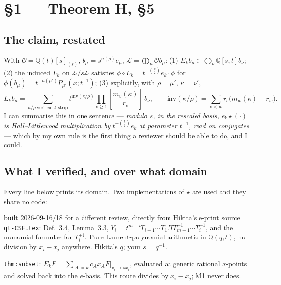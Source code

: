 \documentclass[11pt]{article}
\newcommand{\qbin}[2]{\genfrac{[}{]}{0pt}{}{#1}{#2}}
\begin{document}
\section{\S1 --- Theorem H, \S5}

\subsection{The claim, restated}

With $\mathcal O=\mathbb Q(t)[s]_{(s)}$, $b_\mu=s^{n(\mu)}e_\mu$, $\mathcal L=\bigoplus_\mu\mathcal O b_\mu$:
(1) $E_kb_\mu\in\bigoplus_\nu\mathbb Q[s,t]b_\nu$; (2) the induced $L_k$ on $\mathcal L/s\mathcal L$
satisfies $\phi\circ L_k=t^{-\binom k2}e_k\cdot\phi$ for
$\phi(\bar b_\mu)=t^{-n(\mu')}P_{\mu'}(x;t^{-1})$; (3) explicitly, with $\rho=\mu'$, $\kappa=\nu'$,
\[ L_k\bar b_\mu=\sum_{\kappa/\rho\ \text{vertical $k$-strip}}t^{\mathrm{inv}(\kappa/\rho)}
   \prod_{v\ge1}\qbin{m_v(\kappa)}{r_v}\ \bar b_\nu,
   \qquad \mathrm{inv}(\kappa/\rho)=\sum_{v<w}r_v\bigl(m_w(\kappa)-r_w\bigr). \]
I can summarise this in one sentence --- \emph{modulo $s$, in the rescaled basis, $e_k\star(\cdot)$
is Hall--Littlewood multiplication by $t^{-\binom k2}e_k$ at parameter $t^{-1}$, read on conjugates}
--- which by my own rule is the first thing a reviewer should be able to do, and I could.

\subsection{What I verified, and over what domain}

Every line below prints its domain. Two implementations of $\star$ are used and they share no code:
\begin{description}[leftmargin=2.6em,style=nextline,itemsep=0.15em]
\item[\textbf{M1 (mine)}] built 2026-09-16/18 for a different review, directly from Hikita's e-print
source \texttt{qt-CSF.tex}: Def.~3.4, Lemma~3.3, $Y_i=t^{m-i}T_{i-1}\cdots T_1\Pi T_{m-1}^{-1}\cdots T_i^{-1}$,
and the monomial formulae for $T_i^{\pm1}$. Pure Laurent-polynomial arithmetic in $\mathbb Q(q,t)$,
no division by $x_i-x_j$ anywhere. Hikita's $q$; your $s=q^{-1}$.
\item[\textbf{M2 (yours)}] \texttt{thm:subset}: $E_kF=\sum_{|A|=k}c_Ax_AF|_{x_i\mapsto sx_i}$,
evaluated at generic rational $x$-points and solved back into the $e$-basis. This route divides by
$x_i-x_j$; M1 never does.
\end{description}
\end{document}
